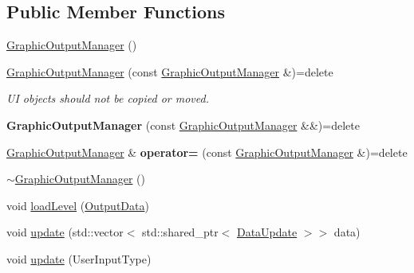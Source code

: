 \subsection*{Public Member Functions}
\begin{DoxyCompactItemize}
\item 
\mbox{\hyperlink{class_graphic_output_manager_adf8a096f7b671b182b74bb130ffd6b99}{Graphic\+Output\+Manager}} ()
\item 
\mbox{\label{class_graphic_output_manager_accbac7b69a0eacd891cd2196213ec21e}} 
\mbox{\hyperlink{class_graphic_output_manager_accbac7b69a0eacd891cd2196213ec21e}{Graphic\+Output\+Manager}} (const \mbox{\hyperlink{class_graphic_output_manager}{Graphic\+Output\+Manager}} \&)=delete
\begin{DoxyCompactList}\small\item\em UI objects should not be copied or moved. \end{DoxyCompactList}\item 
\mbox{\label{class_graphic_output_manager_a0be3ed3dd2fe8d7a742376754dd1e04f}} 
{\bfseries Graphic\+Output\+Manager} (const \mbox{\hyperlink{class_graphic_output_manager}{Graphic\+Output\+Manager}} \&\&)=delete
\item 
\mbox{\label{class_graphic_output_manager_af289b7768cac2928aaae9990b0a16360}} 
\mbox{\hyperlink{class_graphic_output_manager}{Graphic\+Output\+Manager}} \& {\bfseries operator=} (const \mbox{\hyperlink{class_graphic_output_manager}{Graphic\+Output\+Manager}} \&)=delete
\item 
\mbox{\hyperlink{class_graphic_output_manager_a13de402f591b8bfa7a11d4c2b84dfd83}{$\sim$\+Graphic\+Output\+Manager}} ()
\item 
void \mbox{\hyperlink{class_graphic_output_manager_af2d827a7b2ae16889e66e67c18c731d1}{load\+Level}} (\mbox{\hyperlink{class_output_data}{Output\+Data}})
\item 
void \mbox{\hyperlink{class_graphic_output_manager_aed60e3ba3328c6ca2ab0b3bf60e9871f}{update}} (std\+::vector$<$ std\+::shared\+\_\+ptr$<$ \mbox{\hyperlink{class_data_update}{Data\+Update}} $>$$>$ data)
\item 
void \mbox{\hyperlink{class_graphic_output_manager_a64226361d4d827e5c16b76fcf86f4f6f}{update}} (User\+Input\+Type)
\item 
\mbox{\label{class_graphic_output_manager_a2d86a80cc16bd37fc3dbe29fd1c19ab5}} 
$$
\end{DoxyCompactItemize}
